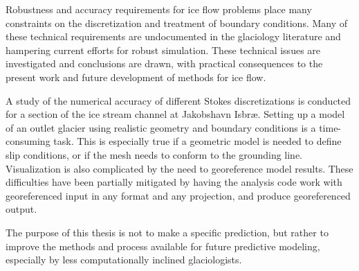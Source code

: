 Robustness and accuracy requirements for ice flow problems place many constraints on the discretization and treatment of boundary conditions.
Many of these technical requirements are undocumented in the glaciology literature and hampering current efforts for robust simulation.
These technical issues are investigated and conclusions are drawn, with practical consequences to the present work and future development of methods for ice flow.

A study of the numerical accuracy of different Stokes discretizations is conducted for a section of the ice stream channel at Jakobshavn Isbr{\ae}.
Setting up a model of an outlet glacier using realistic geometry and boundary conditions is a time-consuming task.
This is especially true if a geometric model is needed to define slip conditions, or if the mesh needs to conform to the grounding line.
Visualization is also complicated by the need to georeference model results.
These difficulties have been partially mitigated by having the analysis code work with georeferenced input in any format and any projection, and produce georeferenced output.

The purpose of this thesis is not to make a specific prediction, but rather to improve the methods and process available for future predictive modeling, especially by less computationally inclined glaciologists.
